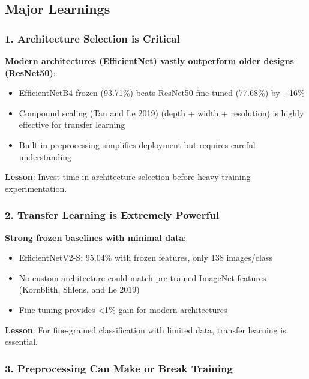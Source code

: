 \documentclass[
  letterpaper,
  DIV=11,
  numbers=noendperiod]{scrartcl}
\providecommand{\tightlist}{%
  \setlength{\itemsep}{0pt}\setlength{\parskip}{0pt}}
\begin{document}
\subsection{Major Learnings}\label{major-learnings}

\subsubsection{1. Architecture Selection is
Critical}\label{architecture-selection-is-critical}

\textbf{Modern architectures (EfficientNet) vastly outperform older
designs (ResNet50)}:

\begin{itemize}
\tightlist
\item
  EfficientNetB4 frozen (93.71\%) beats ResNet50 fine-tuned (77.68\%) by
  +16\%
\item
  Compound scaling (Tan and Le 2019) (depth + width + resolution) is
  highly effective for transfer learning
\item
  Built-in preprocessing simplifies deployment but requires careful
  understanding
\end{itemize}

\textbf{Lesson}: Invest time in architecture selection before heavy
training experimentation.

\subsubsection{2. Transfer Learning is Extremely
Powerful}\label{transfer-learning-is-extremely-powerful}

\textbf{Strong frozen baselines with minimal data}:

\begin{itemize}
\tightlist
\item
  EfficientNetV2-S: 95.04\% with frozen features, only 138 images/class
\item
  No custom architecture could match pre-trained ImageNet features
  (Kornblith, Shlens, and Le 2019)
\item
  Fine-tuning provides \textless1\% gain for modern architectures
\end{itemize}

\textbf{Lesson}: For fine-grained classification with limited data,
transfer learning is essential.

\subsubsection{3. Preprocessing Can Make or Break
Training}\label{preprocessing-can-make-or-break-training}
\end{document}
